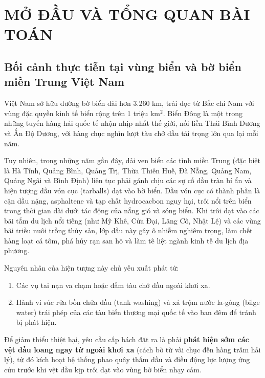 \chapter{MỞ ĐẦU VÀ TỔNG QUAN BÀI TOÁN}
\label{ch:introduction}

\section{Bối cảnh thực tiễn tại vùng biển và bờ biển miền Trung Việt Nam}
\label{sec:vietnam_context}
Việt Nam sở hữu đường bờ biển dài hơn 3.260 km, trải dọc từ Bắc chí Nam với vùng đặc quyền kinh tế biển rộng trên 1 triệu km$^2$. Biển Đông là một trong những tuyến hàng hải quốc tế nhộn nhịp nhất thế giới, nối liền Thái Bình Dương và Ấn Độ Dương, với hàng chục nghìn lượt tàu chở dầu tải trọng lớn qua lại mỗi năm. 

Tuy nhiên, trong những năm gần đây, dải ven biển các tỉnh miền Trung (đặc biệt là Hà Tĩnh, Quảng Bình, Quảng Trị, Thừa Thiên Huế, Đà Nẵng, Quảng Nam, Quảng Ngãi và Bình Định) liên tục phải gánh chịu các sự cố dầu tràn bí ẩn và hiện tượng dầu vón cục (tarballs) dạt vào bờ biển. Dầu vón cục có thành phần là cặn dầu nặng, asphaltene và tạp chất hydrocacbon nguy hại, trôi nổi trên biển trong thời gian dài dưới tác động của nắng gió và sóng biển. Khi trôi dạt vào các bãi tắm du lịch nổi tiếng (như Mỹ Khê, Cửa Đại, Lăng Cô, Nhật Lệ) và các vùng bãi triều nuôi trồng thủy sản, lớp dầu này gây ô nhiễm nghiêm trọng, làm chết hàng loạt cá tôm, phá hủy rạn san hô và làm tê liệt ngành kinh tế du lịch địa phương.

Nguyên nhân của hiện tượng này chủ yếu xuất phát từ:
\begin{enumerate}
    \item Các vụ tai nạn va chạm hoặc đắm tàu chở dầu ngoài khơi xa.
    \item Hành vi súc rửa bồn chứa dầu (tank washing) và xả trộm nước la-gông (bilge water) trái phép của các tàu biển thương mại quốc tế vào ban đêm để tránh bị phát hiện.
\end{enumerate}

Để giảm thiểu thiệt hại, yêu cầu cấp bách đặt ra là phải \textbf{phát hiện sớm các vệt dầu loang ngay từ ngoài khơi xa} (cách bờ từ vài chục đến hàng trăm hải lý), từ đó kích hoạt hệ thống phao quây thấm dầu và điều động lực lượng ứng cứu trước khi vệt dầu kịp trôi dạt vào vùng bờ biển nhạy cảm.

